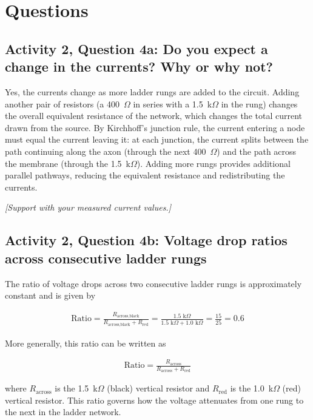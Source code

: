 \message{ !name(lab_report.tex)}\documentclass[12pt]{article}
\begin{document}
\section{Questions}

\subsection*{Activity 2, Question 4a: Do you expect a change in the currents? Why or why not?}

Yes, the currents change as more ladder rungs are added to the circuit. Adding another pair of resistors (a 400~$\Omega$ in series with a 1.5~k$\Omega$ in the rung) changes the overall equivalent resistance of the network, which changes the total current drawn from the source. By Kirchhoff's junction rule, the current entering a node must equal the current leaving it: at each junction, the current splits between the path continuing along the axon (through the next 400~$\Omega$) and the path across the membrane (through the 1.5~k$\Omega$). Adding more rungs provides additional parallel pathways, reducing the equivalent resistance and redistributing the currents.

\textit{[Support with your measured current values.]}

\subsection*{Activity 2, Question 4b: Voltage drop ratios across consecutive ladder rungs}

The ratio of voltage drops across two consecutive ladder rungs is approximately constant and is given by

\begin{align*}
    \text{Ratio} = \frac{R_{\text{across,black}}}{R_{\text{across,black}} + R_{\text{red}}} = \frac{1.5\text{ k}\Omega}{1.5\text{ k}\Omega + 1.0\text{ k}\Omega} = \frac{15}{25} = 0.6
\end{align*}

More generally, this ratio can be written as

\begin{align*}
    \text{Ratio} = \frac{R_{\text{across}}}{R_{\text{across}} + R_{\text{red}}}
\end{align*}

where $R_{\text{across}}$ is the 1.5~k$\Omega$ (black) vertical resistor and $R_{\text{red}}$ is the 1.0~k$\Omega$ (red) vertical resistor. This ratio governs how the voltage attenuates from one rung to the next in the ladder network.
\end{document}
